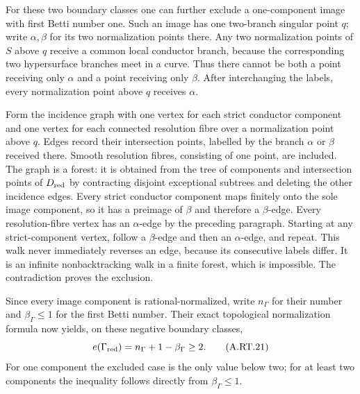 For these two boundary classes one can further exclude a
one-component image with first Betti number one. Such an image
has one two-branch singular point $q$; write $\alpha,\beta$
for its two normalization points there. Any two normalization
points of $S$ above $q$ receive a common local conductor branch,
because the corresponding two hypersurface branches meet in
a curve. Thus there cannot be both a point receiving only
$\alpha$ and a point receiving only $\beta$. After interchanging
the labels, every normalization point above $q$ receives
$\alpha$.

Form the incidence graph with one vertex for each strict
conductor component and one vertex for each connected
resolution fibre over a normalization point above $q$.
Edges record their intersection points, labelled by the
branch $\alpha$ or $\beta$ received there. Smooth resolution
fibres, consisting of one point, are included. The graph is
a forest: it is obtained from the tree of components and
intersection points of $D_{\rm red}$ by contracting disjoint
exceptional subtrees and deleting the other incidence edges.
Every strict conductor component maps finitely onto the sole
image component, so it has a preimage of $\beta$ and therefore
a $\beta$-edge. Every resolution-fibre vertex has an
$\alpha$-edge by the preceding paragraph. Starting at any
strict-component vertex, follow a $\beta$-edge and then an
$\alpha$-edge, and repeat. This walk never immediately reverses
an edge, because its consecutive labels differ. It is an
infinite nonbacktracking walk in a finite forest, which is
impossible. The contradiction proves the exclusion.

Since every image component is rational-normalized, write
$n_\Gamma$ for their number and $\beta_\Gamma\le1$ for the
first Betti number. Their exact topological normalization
formula now yields, on these negative boundary classes,
\[
 e(\Gamma_{\rm red})=n_\Gamma+1-\beta_\Gamma\ge2.
 \tag{A.RT.21}\label{cdp:eq:A.RT.21}
\]
For one component the excluded case is the only value below
two; for at least two components the inequality follows
directly from $\beta_\Gamma\le1$.


